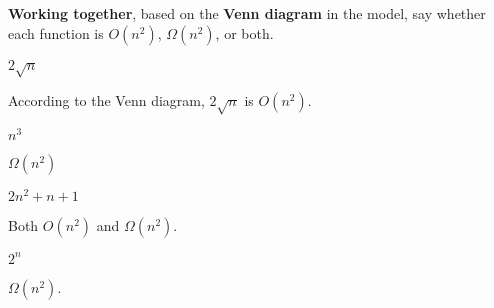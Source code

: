 \documentclass{tufte-handout}
\begin{document}
\begin{questions}
\item \textbf{Working together}, based on the \textbf{Venn diagram} in
  the model, say whether each function is $O(n^2)$, $\Omega(n^2)$, or
  both. 
  \begin{subquestions}
  \item $2\sqrt n$
    \begin{answer}According to the Venn diagram, $2\sqrt n$ is $O(n^2)$.\end{answer}
  \item $n^3$
    \begin{answer}$\Omega(n^2)$\end{answer}
  \item $2n^2 + n + 1$
    \begin{answer}Both $O(n^2)$ and $\Omega(n^2)$.\end{answer}
  \item $2^n$
    \begin{answer}$\Omega(n^2)$.\end{answer}
  \end{subquestions}
\end{questions}

\hline \bigskip
\end{document}
